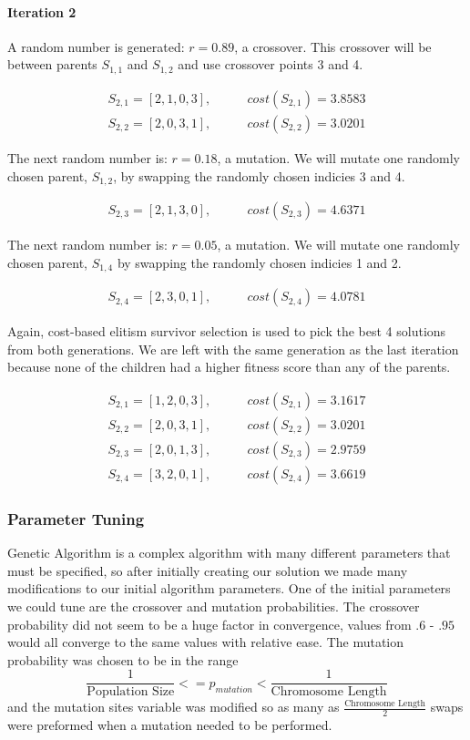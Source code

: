 \documentclass[a4paper]{article}
\newcommand{\subsubsubsection}[1]{\paragraph{#1} \mbox{}}
\begin{document}
\subsubsubsection{Iteration 2}
A random number is generated: $r=0.89$, a crossover. This crossover will be between parents $S_{1,1}$ and $S_{1,2}$ and use crossover points 3 and 4.

\begin{align*}
S_{2,1} = [2, 1, 0, 3], & \qquad cost(S_{2,1}) = 3.8583 \\
S_{2,2} = [2, 0, 3, 1], & \qquad cost(S_{2,2}) = 3.0201
\end{align*}

The next random number is: $r=0.18$, a mutation. We will mutate one randomly chosen parent, $S_{1,2}$, by swapping the randomly chosen indicies 3 and 4.

\begin{align*}
S_{2,3} = [2, 1, 3, 0], & \qquad cost(S_{2,3}) = 4.6371
\end{align*}

The next random number is: $r=0.05$, a mutation. We will mutate one randomly chosen parent, $S_{1,4}$ by swapping the randomly chosen indicies 1 and 2.

\begin{align*}
S_{2,4} = [2, 3, 0, 1], & \qquad cost(S_{2,4}) = 4.0781
\end{align*}

Again, cost-based elitism survivor selection is used to pick the best 4 solutions from both generations. We are left with the same generation as the last iteration because none of the children had a higher fitness score than any of the parents.

\begin{align*}
S_{2,1} = [1, 2, 0, 3], & \qquad cost(S_{2,1}) = 3.1617 \\
S_{2,2} = [2, 0, 3, 1], & \qquad cost(S_{2,2}) = 3.0201 \\
S_{2,3} = [2, 0, 1, 3], & \qquad cost(S_{2,3}) = 2.9759 \\
S_{2,4} = [3, 2, 0, 1], & \qquad cost(S_{2,4}) = 3.6619
\end{align*}

\subsubsection{Parameter Tuning}

Genetic Algorithm is a complex algorithm with many different parameters that must be specified, so after initially creating our solution we made many modifications to our initial algorithm parameters. One of the initial parameters we could tune are the crossover and mutation probabilities. The crossover probability did not seem to be a huge factor in convergence, values from $.6$ - $.95$ would all converge to the same values with relative ease. The mutation probability was chosen to be in the range $$\frac{1}{\text{Population Size}} <= p_\mathit{mutation} < \frac{1}{\text{Chromosome Length}}$$ and the mutation sites variable was modified so as many as $\frac{\text{Chromosome Length}}{2}$ swaps were preformed when a mutation needed to be performed.
\end{document}
